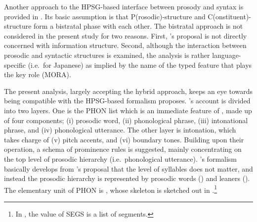 Another approach to the HPSG-based interface between prosody and
syntax is provided in \citet{yoshimoto:00}. Its basic
assumption is that P(rosodic)-structure and C(onstituent)-structure
form a bistratal phase with each other. The bistratal approach is not
considered in the present study for two reasons. First,
\citeauthor{yoshimoto:00}'s proposal is not directly concerned with
information structure. Second, although the interaction between
prosodic and syntactic structures is examined, the analysis is rather
language-specific (i.e.\ for Japanese) as implied by the name of the
typed feature that plays the key role (MORA).



The present analysis, largely accepting the hybrid approach, keeps an
eye towards being compatible with the HPSG-based formalism
\citet{bildhauer:07} proposes.  \citeauthor{bildhauer:07}'s account is
divided into two layers. One is the PHON list which is an immediate
feature of , made up of four components; (i) prosodic word,
(ii) phonological phrase, (iii) intonational phrase, and (iv)
phonological utterance. The other layer is intonation, which takes
charge of (v) pitch accents, and (vi) boundary
tones. Building upon their operation, a schema of  prominence
rules is suggested, mainly concentrating on the top level of prosodic
hierarchy (i.e.\ phonological utterance). \citeauthor{bildhauer:07}'s
formalism basically develops from \citet{klein:00}'s proposal that the
level of syllables does not matter, and instead the prosodic hierarchy
is represented by prosodic words () and leaners
(). The elementary unit of PHON is , whose skeleton
is sketched out in 
\citep[p.\ 161]{bildhauer:07}.\footnote{In
  , the value of SEGS is a list of
  segments.}


